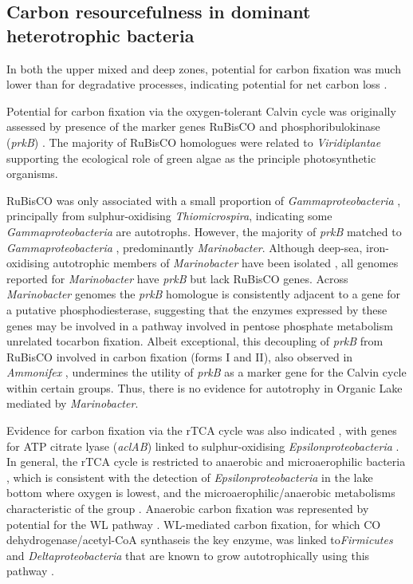 \subsection{Carbon resourcefulness in dominant heterotrophic bacteria}
\label{subs:carbon}
In both the upper mixed and deep zones, potential for carbon fixation was much lower than for degradative processes, indicating potential for net carbon loss .
 
Potential for carbon fixation via the oxygen-tolerant Calvin cycle  was originally assessed by presence of the marker genes \ac{RuBisCO} and phosphoribulokinase (\emph{prkB}) \cite{Hugler2011}. 
The majority of \ac{RuBisCO} homologues were related to \emph{Viridiplantae}  supporting the ecological role of green algae as the principle photosynthetic organisms. 

\ac{RuBisCO} was only associated with a small proportion of \emph{Gammaproteobacteria} , principally from sulphur-oxidising \emph{Thiomicrospira}, indicating some \emph{Gammaproteobacteria} are autotrophs. 
However, the majority of \emph{prkB} matched to \emph{Gammaproteobacteria} , predominantly \emph{Marinobacter}. 
Although deep-sea, iron-oxidising autotrophic members of \emph{Marinobacter} have been isolated \cite{Edwards2003}, all genomes reported for \emph{Marinobacter} have \emph{prkB} but lack \ac{RuBisCO} genes. 
Across \emph{Marinobacter} genomes the \emph{prkB} homologue is consistently adjacent to a gene for a putative phosphodiesterase, suggesting that the enzymes expressed by these genes may be involved in a pathway involved in pentose phosphate metabolism unrelated tocarbon fixation. 
Albeit exceptional, this decoupling of \emph{prkB} from \ac{RuBisCO} involved in carbon fixation (forms I and II), also observed in \emph{Ammonifex} \cite{Hugler2011}, undermines the utility of \emph{prkB} as a marker gene for the Calvin cycle within certain groups. 
Thus, there is no evidence for autotrophy in Organic Lake mediated by \emph{Marinobacter}.

Evidence for carbon fixation via the \ac{rTCA} cycle was also indicated , with genes for ATP citrate lyase (\emph{aclAB}) linked to sulphur-oxidising \emph{Epsilonproteobacteria} . 
In general, the \ac{rTCA} cycle is restricted to anaerobic and microaerophilic bacteria \cite{Hugler2011}, which is consistent with the detection of \emph{Epsilonproteobacteria} in the lake bottom where oxygen is lowest, and the microaerophilic/anaerobic metabolisms characteristic of the group \cite{Campbell2006}.
Anaerobic carbon fixation was represented by potential for the \ac{WL} pathway . 
\ac{WL}-mediated carbon fixation, for which CO dehydrogenase/acetyl-CoA synthaseis the key enzyme, was linked to\emph{Firmicutes} and \emph{Deltaproteobacteria} that are known to grow autotrophically using this pathway \cite{Hugler2011}. 

